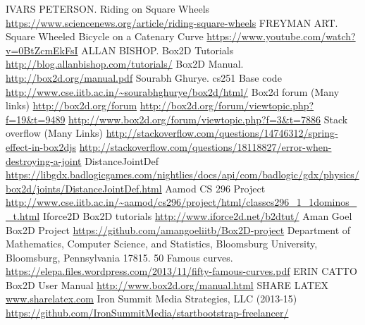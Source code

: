 \documentclass[12pt, a4paper]{article}
\begin{document}
\begin{thebibliography}{9}
IVARS PETERSON.
Riding on Square Wheels
\url{https://www.sciencenews.org/article/riding-square-wheels}
FREYMAN ART.
Square Wheeled Bicycle on a Catenary Curve
\url{https://www.youtube.com/watch?v=0BtZcmEkFsI}
ALLAN BISHOP.
Box2D Tutorials
\url{http://blog.allanbishop.com/tutorials/}
Box2D Manual. 
\url{http://box2d.org/manual.pdf}
Sourabh Ghurye.
cs251 Base code
\url{http://www.cse.iitb.ac.in/~sourabhghurye/box2d/html/}
Box2d forum (Many links)
\url{http://box2d.org/forum}
\url{http://box2d.org/forum/viewtopic.php?f=19&t=9489}
\url{http://www.box2d.org/forum/viewtopic.php?f=3&t=7886}
Stack overflow (Many Links) 
\url{http://stackoverflow.com/questions/14746312/spring-effect-in-box2djs}
\url{http://stackoverflow.com/questions/18118827/error-when-destroying-a-joint}
DistanceJointDef
\url{https://libgdx.badlogicgames.com/nightlies/docs/api/com/badlogic/gdx/physics/box2d/joints/DistanceJointDef.html}
Aamod
CS 296 Project
\url{http://www.cse.iitb.ac.in/~aamod/cs296/project/html/classcs296_1_1dominos__t.html}
Iforce2D Box2D tutorials
\url{http://www.iforce2d.net/b2dtut/}
Aman Goel
Box2D Project
\url{https://github.com/amangoeliitb/Box2D-project}
Department of Mathematics, Computer Science, and Statistics, Bloomsburg University, Bloomsburg, Pennsylvania 17815.
50 Famous curves.
\url{https://elepa.files.wordpress.com/2013/11/fifty-famous-curves.pdf}
ERIN CATTO
Box2D User Manual
\url{http://www.box2d.org/manual.html}
SHARE LATEX
\url{www.sharelatex.com}
 Iron Summit Media Strategies, LLC (2013-15)	
\url{https://github.com/IronSummitMedia/startbootstrap-freelancer/}
\end{thebibliography}
\end{document}
